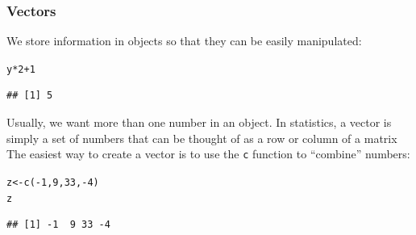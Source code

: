 \documentclass[color=usenames,dvipsnames]{beamer}\usepackage[]{graphicx}\usepackage[]{color}
\makeatletter
\newcommand{\hlnum}[1]{\textcolor[rgb]{0.69,0.494,0}{#1}}%
\newcommand{\hlopt}[1]{\textcolor[rgb]{0,0,0}{#1}}%
\newcommand{\hlstd}[1]{\textcolor[rgb]{0,0,0}{#1}}%
\newcommand{\hlkwb}[1]{\textcolor[rgb]{0,0.341,0.682}{#1}}%
\newcommand{\hlkwd}[1]{\textcolor[rgb]{0.004,0.004,0.506}{#1}}%
\newenvironment{kframe}{%
 \def\at@end@of@kframe{}%
 \ifinner\ifhmode%
  \def\at@end@of@kframe{\end{minipage}}%
  \begin{minipage}{\columnwidth}%
 \fi\fi%
 \def\FrameCommand##1{\hskip\@totalleftmargin \hskip-\fboxsep
 \colorbox{shadecolor}{##1}\hskip-\fboxsep
     \hskip-\linewidth \hskip-\@totalleftmargin \hskip\columnwidth}%
 \MakeFramed {\advance\hsize-\width
   \@totalleftmargin\z@ \linewidth\hsize
   \@setminipage}}%
 {\par\unskip\endMakeFramed%
 \at@end@of@kframe}
\newenvironment{knitrout}{}{} %
\newcommand{\inr}[1]{\colorbox{inlinecolor}{\texttt{#1}}}
\makeatother
\begin{document}
\begin{frame}[fragile]
  \frametitle{Vectors}
We store information in objects so that they can be easily manipulated:
\begin{knitrout}\small
{}\color{fgcolor}\begin{kframe}
\begin{alltt}
\hlstd{y}\hlopt{*}\hlnum{2}\hlopt{+}\hlnum{1}
\end{alltt}
\begin{verbatim}
## [1] 5
\end{verbatim}
\end{kframe}
\end{knitrout}
\pause \vfill
Usually, we want more than one number in an object. In statistics, a
vector is simply a set of numbers that can be thought of as a row or
column of a matrix \\
\pause \vfill
The easiest way to create a vector is to use the \inr{c}
function to ``combine'' numbers:
\begin{knitrout}\small
{}\color{fgcolor}\begin{kframe}
\begin{alltt}
\hlstd{z} \hlkwb{<-} \hlkwd{c}\hlstd{(}\hlopt{-}\hlnum{1}\hlstd{,} \hlnum{9}\hlstd{,} \hlnum{33}\hlstd{,} \hlopt{-}\hlnum{4}\hlstd{)}
\hlstd{z}
\end{alltt}
\begin{verbatim}
## [1] -1  9 33 -4
\end{verbatim}
\end{kframe}
\end{knitrout}
\end{frame}



\end{document}
